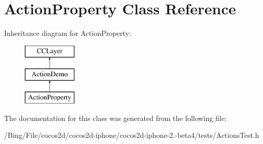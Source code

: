 \hypertarget{interface_action_property}{\section{Action\-Property Class Reference}
\label{interface_action_property}
}
Inheritance diagram for Action\-Property\-:\begin{figure}[H]
\begin{center}
\leavevmode
\includegraphics[height=3.000000cm]{interface_action_property}
\end{center}
\end{figure}


The documentation for this class was generated from the following file\-:\begin{DoxyCompactItemize}
\item 
/\-Bing/\-File/cocos2d/cocos2d-\/iphone/cocos2d-\/iphone-\/2.-\/beta4/tests/Actions\-Test.\-h\end{DoxyCompactItemize}
